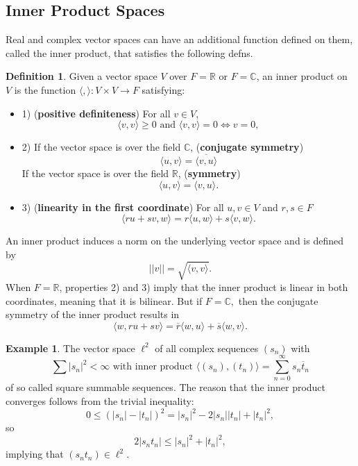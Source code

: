 \documentclass{article}
\theoremstyle{definition}
\newtheorem{exmp}[thm]{Example}
\newtheorem{defn}[thm]{Definition}
\theoremstyle{remark}
\numberwithin{equation}{section}
\begin{document}
\subsection{Inner Product Spaces}
Real and complex vector spaces can have an additional function defined on them, called the inner product, that satisfies the following defns. 
\begin{defn} 
Given a vector space $V$ over $F = \mathbb{R}$ or $F = \mathbb{C}$, an inner product on $V$ is the function $\langle , \rangle : V \times V \rightarrow F$ satisfying:
\begin{itemize}
    \item 1) (\textbf{positive definiteness}) For all $v \in V$, 
    $$\langle v, v \rangle \geq 0 \text{ and } \langle v, v \rangle = 0 \iff v = 0 ,$$
    \item 2) If the vector space is over the field $\mathbb{C}$, (\textbf{conjugate symmetry})
    $$\langle u, v \rangle = \overline{\langle v, u \rangle} $$
    If the vector space is over the field $\mathbb{R}$, (\textbf{symmetry})
    $$\langle u, v \rangle = \langle v, u \rangle .$$
    \item 3) (\textbf{linearity in the first coordinate}) For all $u,v \in V$ and $r,s \in F$
    $$\langle ru + sv, w \rangle = r \langle u, w \rangle + s\langle v, w \rangle . $$
\end{itemize}
An inner product induces a norm on the underlying vector space and is defined by 
$$|| v || = \sqrt{\langle v, v \rangle}.$$ When $F = \mathbb{R}$, properties 2) and 3) imply that the inner product is linear in both coordinates, meaning that it is bilinear. But if $F = \mathbb{C},$ then the conjugate symmetry of the inner product results in  
$$\langle w, ru + sv \rangle = \overline{r} \langle w, u \rangle + \overline{s} \langle w, v \rangle .$$

\begin{exmp}
The vector space $\ell ^2$ of all complex sequences $(s_n)$ with  
$$\sum |s_n| ^2 < \infty \text{ with inner product } \langle (s_n), (t_n) \rangle = \sum _{n = 0} ^\infty s_n \overline{t}_n$$
of so called square summable sequences. The reason that the inner product converges follows from the trivial inequality: 
$$0 \leq (|s_n| - |t_n|)^2 = |s_n|^2 - 2|s_n| |t_n| + |t_n|^2,$$
so 
$$2 |s_n t_n| \leq |s_n|^2 + |t_n|^2,$$
implying that $(s_n t_n) \in \ell ^2$. 
\end{exmp}
\end{defn}
\end{document}

